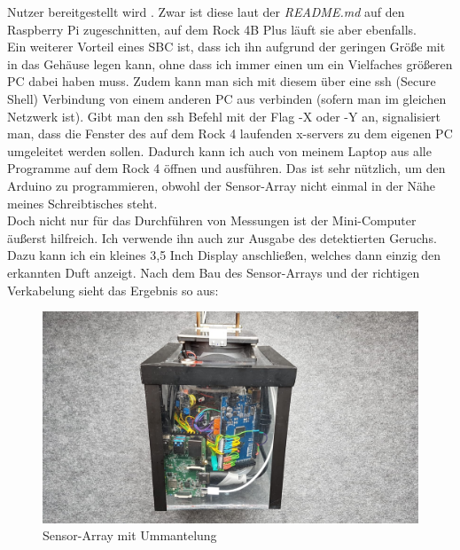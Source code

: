 \documentclass[10pt]{article}
\begin{document}
Nutzer bereitgestellt wird \autocite{ARM_ArduinoIDE}. Zwar ist diese laut der \textit{README.md} auf den Raspberry Pi zugeschnitten, 
auf dem Rock 4B Plus läuft sie aber ebenfalls.\\
Ein weiterer Vorteil eines SBC ist, dass ich ihn aufgrund der geringen Größe mit in das Gehäuse legen kann, ohne dass ich immer einen um ein Vielfaches größeren
PC dabei haben muss. Zudem kann man sich mit diesem über eine ssh (Secure Shell) Verbindung von einem anderen PC aus verbinden (sofern man im gleichen Netzwerk ist). 
Gibt man den ssh Befehl mit der Flag -X oder -Y an, signalisiert man, dass die Fenster des auf dem Rock 4 laufenden x-servers zu dem eigenen PC umgeleitet werden
sollen. Dadurch kann ich auch von meinem Laptop aus 
alle Programme auf dem Rock 4 öffnen und ausführen. Das ist sehr nützlich, um den Arduino zu programmieren, obwohl der Sensor-Array nicht einmal in der Nähe
meines Schreibtisches steht.\\
Doch nicht nur für das Durchführen von Messungen ist der Mini-Computer äußerst hilfreich. Ich verwende ihn auch zur Ausgabe des detektierten Geruchs. Dazu kann ich 
ein kleines 3,5 Inch Display anschließen, welches dann einzig den erkannten Duft anzeigt.
Nach dem Bau des Sensor-Arrays und der richtigen Verkabelung sieht das Ergebnis so aus:\\

\begin{figure}[H]
\centering
\includegraphics[scale=0.2]{Bilder/Nase.jpeg}
\caption{Sensor-Array mit Ummantelung}
\label{Sensor-Array_mit_Ummantelung}
\end{figure}
\end{document}
